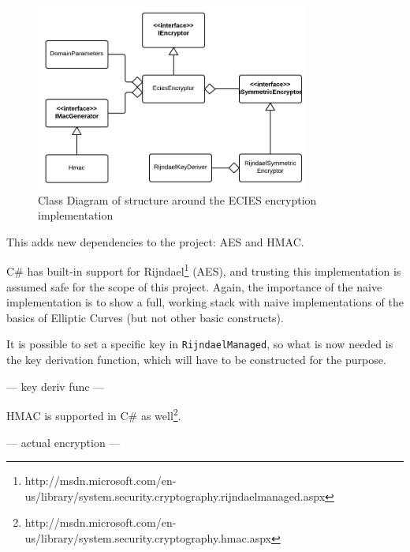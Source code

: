 \begin{figure}[ht!]
	\centering
	\includegraphics[width=90mm]{img/naive_implementation__encryption__ecies_class_diagram.png}
	\caption{Class Diagram of structure around the ECIES encryption implementation}
	\label{ecies_class_diagram}
\end{figure}

This adds new dependencies to the project: AES and HMAC.

C\# has built-in support for Rijndael\footnote{http://msdn.microsoft.com/en-us/library/system.security.cryptography.rijndaelmanaged.aspx}
(AES), and trusting this implementation is assumed safe for the scope of this project. Again, the importance of the naive implementation
is to show a full, working stack with naive implementations of the basics of Elliptic Curves (but not other basic constructs).

It is possible to set a specific key in \verb+RijndaelManaged+, so what is now needed is the key derivation function, which will have to
be constructed for the purpose.

--- key deriv func ---

HMAC is supported in C\# as well\footnote{http://msdn.microsoft.com/en-us/library/system.security.cryptography.hmac.aspx}.

--- actual encryption ---